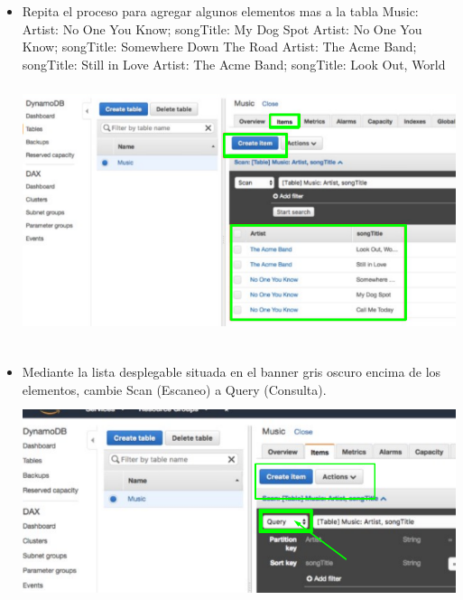 \documentclass[12pt,a4paper,oneside]{book}
\begin{document}
\begin{itemize}
	\item {Repita el proceso para agregar algunos elementos mas a la tabla Music:
		Artist: No One You Know; songTitle: My Dog Spot Artist: No One You Know; songTitle: Somewhere Down The Road Artist: The Acme Band; songTitle: Still in Love Artist: The Acme Band; songTitle: Look Out, World}\\
	
	\includegraphics[width=16cm, height=8cm]{img/11.png}\\
	
	\item {Mediante la lista desplegable situada en el banner gris oscuro encima de los elementos, cambie Scan (Escaneo) a Query (Consulta).}\\
	
	\includegraphics[width=16cm, height=6cm]{img/12.png}\\
	
\end{itemize}

\newpage
\end{document}

